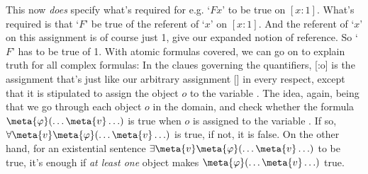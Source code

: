 This now \emph{does} specify what's required for e.g. `$Fx$' to be true on $[x:1]$.  What's required is that `$F$' be true of the referent of `$x$' on $[x:1]$.  And the referent of `$x$' on this assignment is of course just 1, give our expanded notion of reference.  So `$F$' has to be true of 1.  With atomic formulas covered, we can go on to explain truth for all complex formulas:
In the claues governing the quantifiers, [:o] is the assignment that's just like our arbitrary assignment [] in every respect, except that it is stipulated to assign the object $o$ to the variable .  The idea, again, being that we go through each object $o$ in the domain, and check whether the formula $\meta{\varphi}(\ldots \meta{v} \ldots)$ is true when $o$ is assigned to the variable .  If so, $\forall \meta{v}\meta{\varphi}(\ldots \meta{v} \ldots)$ is true, if not, it is false.  On the other hand, for an existential sentence $\exists \meta{v}\meta{\varphi}(\ldots \meta{v} \ldots)$ to be true, it's enough if \emph{at least one} object makes $\meta{\varphi}(\ldots \meta{v} \ldots)$ true.

